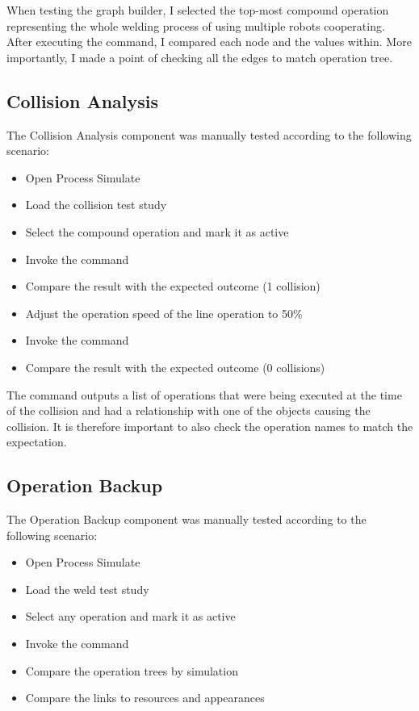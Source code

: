When testing the graph builder, I selected the top-most compound operation representing the whole welding process of using multiple robots cooperating. 
After executing the command, I compared each node and the values within. 
More importantly, I made a point of checking all the edges to match operation tree.

\subsection{Collision Analysis}

The Collision Analysis component was manually tested according to the following scenario: 

\begin{itemize}
    \item Open Process Simulate
    \item Load the collision test study
    \item Select the compound operation and mark it as active
    \item Invoke the  command
    \item Compare the result with the expected outcome (1 collision)
    \item Adjust the operation speed of the line operation to 50\%
    \item Invoke the  command
    \item Compare the result with the expected outcome (0 collisions)
\end{itemize}

The  command outputs a list of operations that were being executed at the time of the collision and had a relationship with one of the objects causing the collision.
It is therefore important to also check the operation names to match the expectation.

\subsection{Operation Backup}

The Operation Backup component was manually tested according to the following scenario: 

\begin{itemize}
    \item Open Process Simulate
    \item Load the weld test study
    \item Select any operation and mark it as active
    \item Invoke the  command
    \item Compare the operation trees by simulation
    \item Compare the links to resources and appearances
\end{itemize}

